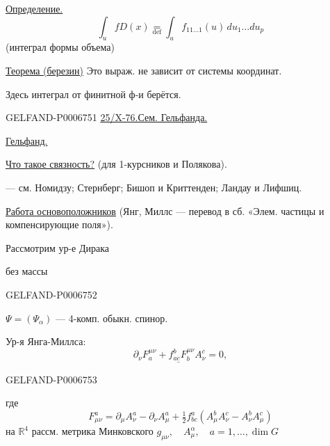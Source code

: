 \underline{Определение.}
\[
\int_u fD(x)\underset{\mathrm{def}}{=}
\int_u f_{11\ldots1}(u)\,du_1\ldots du_p
\]
(интеграл формы объема)

\underline{Теорема (березин)} Это выраж. не зависит от системы координат.

Здесь интеграл от финитной ф-и берётся.


\begin{GelfandAdjacentEvidence}{GELFAND-P000675}{1}
\underline{25/X-76.}\qquad \underline{Сем. Гельфанда.}

\underline{Гельфанд.}

\underline{Что такое связность?} (для 1-курсников и Полякова).

--- см. Номидзу; Стернберг; Бишоп и Криттенден; Ландау и Лифшиц.


\underline{Работа основоположников} (Янг, Миллс --- перевод в сб. «Элем. частицы и компенсирующие поля»).

Рассмотрим ур-е Дирака

{\small без массы}
\end{GelfandAdjacentEvidence}
\begin{GelfandAdjacentEvidence}{GELFAND-P000675}{2}

\(\Psi=(\Psi_\alpha)\) --- 4-комп. обыкн. спинор.

Ур-я Янга-Миллса:
\[
\underline{\partial_\nu F_a^{\mu\nu}+f^b_{ac}F_b^{\mu\nu}A_\nu^c=0},
\]
\end{GelfandAdjacentEvidence}
\begin{GelfandAdjacentEvidence}{GELFAND-P000675}{3}

где
\[
F_{\mu\nu}^a=\partial_\mu A_\nu^a-\partial_\nu A_\mu^a
+\tfrac12 f_{bc}^a(A_\mu^b A_\nu^c-A_\nu^b A_\mu^c)
\]
на \(\mathbb R^4\) рассм. метрика Минковского \(g_{\mu\nu},\quad A_\mu^\alpha,\quad a=1,\ldots,\dim G\)
\end{GelfandAdjacentEvidence}
